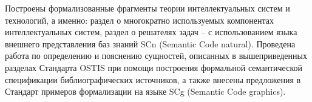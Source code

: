 
Построены формализованные фрагменты теории интеллектуальных систем и технологий, а именно: раздел о многократно используемых компонентах интеллектуальных систем, раздел о решателях задач -- с использованием языка внешнего представления баз знаний SCn (Semantic Code natural). Проведена работа по определению и пояснению сущностей, описанных в вышеприведенных разделах Стандарта OSTIS при помощи построения формальной семантической спецификации библиографических источников, а также внесены предложения в Стандарт примеров формализации на языке SCg (Semantic Code graphics).